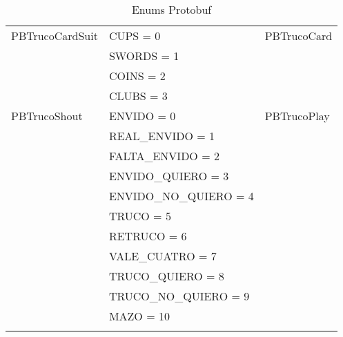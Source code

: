 \begin{longtable}{|p{}|p{}|p{}|}
    \hline
    PBTrucoCardSuit & CUPS = 0 & PBTrucoCard \\
                    & SWORDS = 1 & \\
                    & COINS = 2 & \\
                    & CLUBS = 3 & \\
    \hline
    PBTrucoShout & ENVIDO = 0 & PBTrucoPlay \\
                    & REAL\_ENVIDO = 1 & \\
                    & FALTA\_ENVIDO = 2 & \\
                    & ENVIDO\_QUIERO = 3 & \\
                    & ENVIDO\_NO\_QUIERO = 4 & \\
                    & TRUCO = 5 & \\
                    & RETRUCO = 6 & \\
                    & VALE\_CUATRO = 7 & \\
                    & TRUCO\_QUIERO = 8 & \\
                    & TRUCO\_NO\_QUIERO = 9 & \\
                    & MAZO = 10 & \\
    \hline
    \caption{Enums Protobuf}\\
\end{longtable}